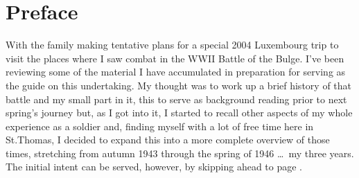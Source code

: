 \chapter*{Preface}

\thispagestyle{plain}
\label{preface}
With the family making tentative plans for a special 2004 Luxembourg trip to visit the places where I saw combat in the WW\thinspace II Battle of the Bulge. I've been reviewing some of the material I have accumulated in preparation for serving as the guide on this undertaking. My thought was to work up a brief history of that battle and my small part in it, this to serve as background reading prior to next spring's journey but, as I got into it, I started to recall other aspects of my whole experience as a soldier and, finding myself with a lot of free time here in St.\@ Thomas, I decided to expand this into a more complete overview of those times, stretching from autumn 1943 through the spring of 1946 \ldots\ my three years. The initial intent can be served, however, by skipping ahead to page \pageref{battle-of-the-bulge}.
\clearpage
